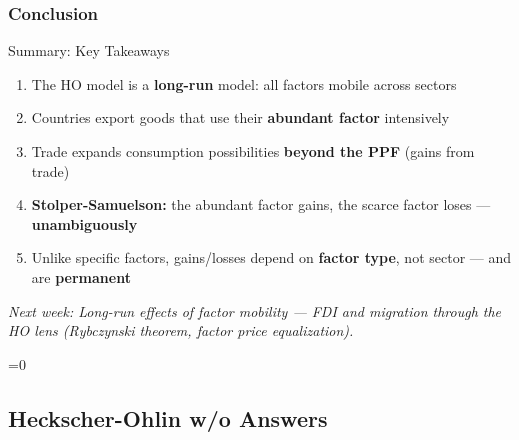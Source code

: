\documentclass{beamer}
\newcommand{\showanswers}{1}  %
\begin{document}
\subsubsection{Conclusion}


\begin{frame}{Summary: Key Takeaways}

\begin{enumerate}
    \item The HO model is a \textbf{long-run} model: all factors mobile across sectors
    
    \vspace{0.2cm}
    
    \item Countries export goods that use their \textbf{abundant factor} intensively
    
    \vspace{0.2cm}
    
    \item Trade expands consumption possibilities \textbf{beyond the PPF} (gains from trade)
    
    \vspace{0.2cm}
    
    \item \textbf{Stolper-Samuelson:} the abundant factor gains, the scarce factor loses --- \textbf{unambiguously}
    
    \vspace{0.2cm}
    
    \item Unlike specific factors, gains/losses depend on \textbf{factor type}, not sector --- and are \textbf{permanent}
\end{enumerate}

\vspace{0.3cm}

\textit{Next week: Long-run effects of factor mobility --- FDI and migration through the HO lens (Rybczynski theorem, factor price equalization).}

\end{frame}



\fi

\ifnum\showanswers=0
\subsection{Heckscher-Ohlin w/o Answers}
\end{document}
